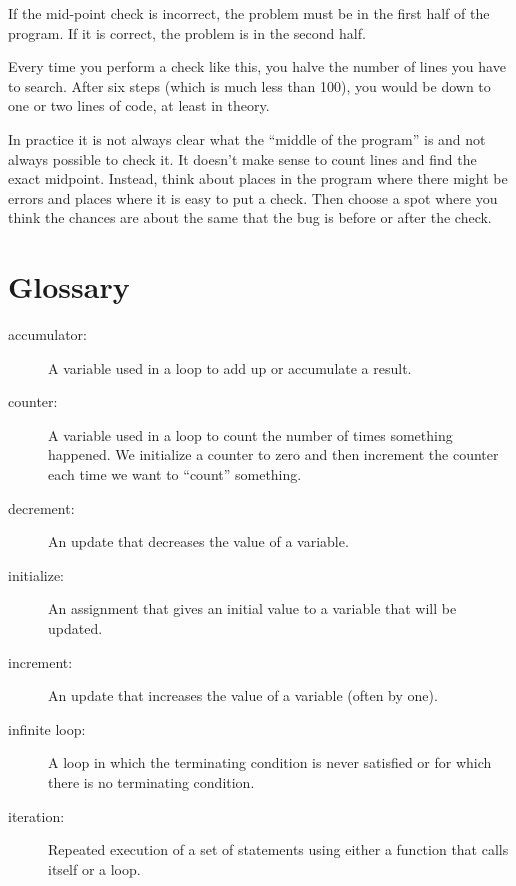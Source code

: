 If the mid-point check is incorrect, the problem must be in the
first half of the program.  If it is correct, the problem is
in the second half.

Every time you perform a check like this, you halve the number
of lines you have to search.  After six steps (which is much
less than 100), you would be down to one or two lines of code,
at least in theory.

In practice it is not always clear what
the ``middle of the program'' is and not always possible to
check it.  It doesn't make sense to count lines and find the
exact midpoint.  Instead, think about places
in the program where there might be errors and places where it
is easy to put a check.  Then choose a spot where you
think the chances are about the same that the bug is before
or after the check.

\section{Glossary}

\begin{description}

\item[accumulator:] A variable used in a loop to add up or
accumulate a result.

\item[counter:] A variable used in a loop to count the number
of times something happened.  We initialize a counter to 
zero and then increment the counter each time we want to
``count'' something.

\item[decrement:] An update that decreases the value of a variable.

\item[initialize:] An assignment that gives an initial value to
a variable that will be updated.

\item[increment:] An update that increases the value of a variable
(often by one).

\item[infinite loop:] A loop in which the terminating condition is
never satisfied or for which there is no terminating condition.

\item[iteration:] Repeated execution of a set of statements using
either a function that calls itself or a loop.

\end{description}


